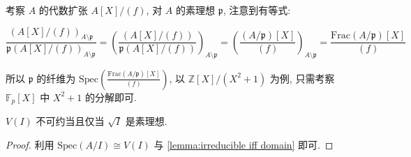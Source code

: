 \begin{example}
    考察 \(A\) 的代数扩张 \(A[X] / (f)\), 对 \(A\) 的素理想 \(\mathfrak{p}\), 注意到有等式:

    \[
        \frac{(A[X]/(f))_{A \setminus \mathfrak{p}}}{\mathfrak{p} (A[X]/(f))_{A \setminus \mathfrak{p}}} = {(\frac{(A[X]/(f))}{\mathfrak{p} (A[X]/(f))})}_{A \setminus \mathfrak{p}}
        = {(\frac{(A/\mathfrak{p}) [X]}{(f)})}_{A \setminus \mathfrak{p}} = \frac{\mathrm{Frac} (A / \mathfrak{p})[X]}{(f)}
    \]

    所以 \(\mathfrak{p}\) 的纤维为 \(\mathrm{Spec} (\frac{\mathrm{Frac} (A / \mathfrak{p})[X]}{(f)})\), 以 \(\mathbb{Z} [X] / (X^2 + 1)\) 为例, 只需考察 \(\mathbb{F}_p [X]\) 中 \(X^2 + 1\) 的分解即可.
\end{example}

\begin{corollary}
    \(V(I)\) 不可约当且仅当 \(\sqrt{I}\) 是素理想.

    \begin{proof}
        利用 \(\mathrm{Spec} (A/I) \cong V(I)\) 与 \ref{lemma:irreducible iff domain} 即可.
    \end{proof}
\end{corollary}
